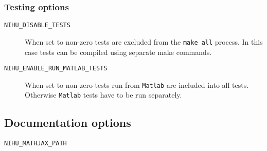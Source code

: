 \documentclass[a4paper,10pt]{article}
\begin{document}
\subsubsection{Testing options}

\begin{description}
	\item [\texttt{NIHU\_DISABLE\_TESTS}] When set to non-zero tests are excluded from the \texttt{make all} process. In this case tests can be compiled using separate make commands.
	\item [\texttt{NIHU\_ENABLE\_RUN\_MATLAB\_TESTS}] When set to non-zero tests run from \texttt{Matlab} are included into all tests. Otherwise \texttt{Matlab} tests have to be run separately.
\end{description}

\subsection{Documentation options}

\begin{description}
	\item [\texttt{NIHU\_MATHJAX\_PATH}] 
\end{description}
\end{document}
